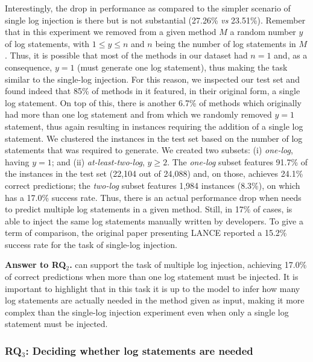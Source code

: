 Interestingly, the drop in performance as compared to the simpler scenario of single log injection is there but is not substantial (27.26\% \emph{vs} 23.51\%). Remember that in this experiment we removed from a given \java method $M$ a random number $y$ of log statements, with $1 \leq y \leq n$ and $n$ being the number of log statements in $M$. Thus, it is possible that most of the methods in our dataset had $n=1$ and, as a consequence, $y=1$ (\ie \approach must generate one log statement), thus making the task similar to the single-log injection. For this reason, we inspected our test set and found indeed that 85\% of methods in it featured, in their original form, a single log statement. On top of this, there is another 6.7\% of methods which originally had more than one log statement and from which we randomly removed $y=1$ statement, thus again resulting in instances requiring the addition of a single log statement. We clustered the instances in the test set based on the number of log statements that \approach was required to generate. We created two subsets: (i) \emph{one-log}, having $y=1$; and (ii) \emph{at-least-two-log}, $y\geq2$. The \emph{one-log} subset features 91.7\% of the instances in the test set (22,104 out of 24,088) and, on those, \approach achieves 24.1\% correct predictions; the \emph{two-log} subset features 1,984 instances (8.3\%), on which \approach has a 17.0\% success rate. Thus, there is an actual performance drop when \approach needs to predict multiple log statements in a given method. Still, in 17\% of cases, \approach is able to inject the same log statements manually written by developers. To give a term of comparison, the original paper presenting LANCE \cite{mastropaolo2022using} reported a 15.2\% success rate for the task of single-log injection.

\vspace{0.2cm}
\begin{resultbox}
\textbf{Answer to RQ$_2$.} \approach can support the task of multiple log injection, achieving 17.0\% of correct predictions when more than one log statement must be injected. It is important to highlight that in this task it is up to the model to infer how many log statements are actually needed in the method given as input, making it more complex than the single-log injection experiment even when only a single log statement must be injected.
\end{resultbox}

\subsubsection{RQ$_{3}$: Deciding whether log statements are needed}
\label{sec:rq3}

